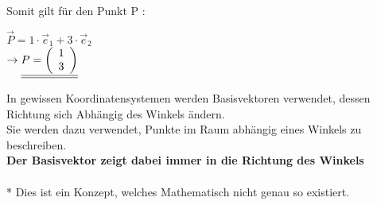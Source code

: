 Somit gilt für den Punkt P : \\
\begin{center}
	$\vec{P} = 1\cdot \vec{e}_1 + 3 \cdot \vec{e}_2$ \\
	$\rightarrow \underline{\underline{ P = \left ( \begin{array}{c} 1 \\ 3 \end{array}\right)}}$
\end{center}
\iend

\newpage


\beginip
In gewissen Koordinatensystemen werden Basisvektoren verwendet, dessen Richtung sich Abhängig  des Winkels ändern. \\
Sie werden dazu verwendet, Punkte im Raum abhängig eines Winkels zu beschreiben. \\
\textbf{Der Basisvektor zeigt dabei immer in die Richtung des Winkels} \\
\\
* Dies ist ein Konzept, welches Mathematisch nicht genau so existiert.
\iend

